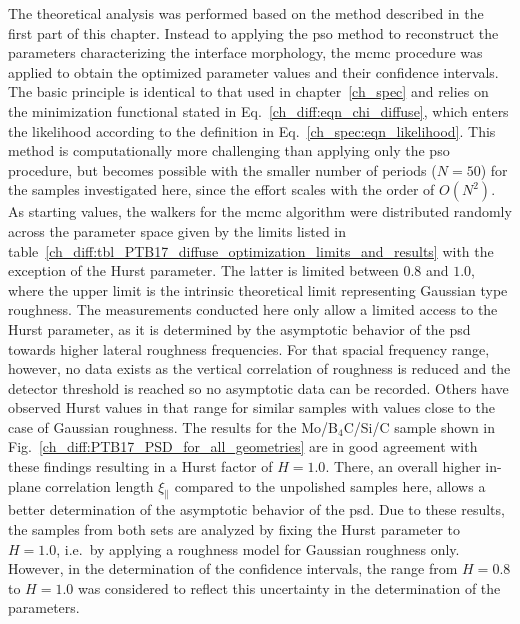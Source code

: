 The theoretical analysis was performed based on the method described in the first part of this chapter. Instead to applying the \gls{pso} method to reconstruct the parameters characterizing the interface morphology, the \gls{mcmc} procedure was applied to obtain the optimized parameter values and their confidence intervals. The basic principle is identical to that used in chapter~\ref{ch_spec} and relies on the minimization functional stated in Eq.~\eqref{ch_diff:eqn_chi_diffuse}, which enters the likelihood according to the definition in Eq.~\eqref{ch_spec:eqn_likelihood}. This method is computationally more challenging than applying only the \gls{pso} procedure, but becomes possible with the smaller number of periods ($N=50$) for the samples investigated here, since the effort scales with the order of $O(N^2)$. As starting values, the walkers for the \gls{mcmc} algorithm were distributed randomly across the parameter space given by the limits listed in table~\ref{ch_diff:tbl_PTB17_diffuse_optimization_limits_and_results} with the exception of the Hurst parameter. The latter is limited between $0.8$ and $1.0$, where the upper limit is the intrinsic theoretical limit representing Gaussian type roughness. The measurements conducted here only allow a limited access to the Hurst parameter, as it is determined by the asymptotic behavior of the \gls{psd} towards higher lateral roughness frequencies. For that spacial frequency range, however, no data exists as the vertical correlation of roughness is reduced and the detector threshold is reached so no asymptotic data can be recorded. Others \cite{rack_comparative_2010} have observed Hurst values in that range for similar samples with values close to the case of Gaussian roughness. The results for the Mo/B$_4$C/Si/C sample shown in Fig.~\ref{ch_diff:PTB17_PSD_for_all_geometries} are in good agreement with these findings resulting in a Hurst factor of $H=1.0$. There, an overall higher in-plane correlation length $\xi_\parallel$ compared to the unpolished samples here, allows a better determination of the asymptotic behavior of the \gls{psd}. Due to these results, the samples from both sets are analyzed by fixing the Hurst parameter to $H=1.0$, i.e.~by applying a roughness model for Gaussian roughness only. However, in the determination of the confidence intervals, the range from $H=0.8$ to $H=1.0$ was considered to reflect this uncertainty in the determination of the parameters. 

